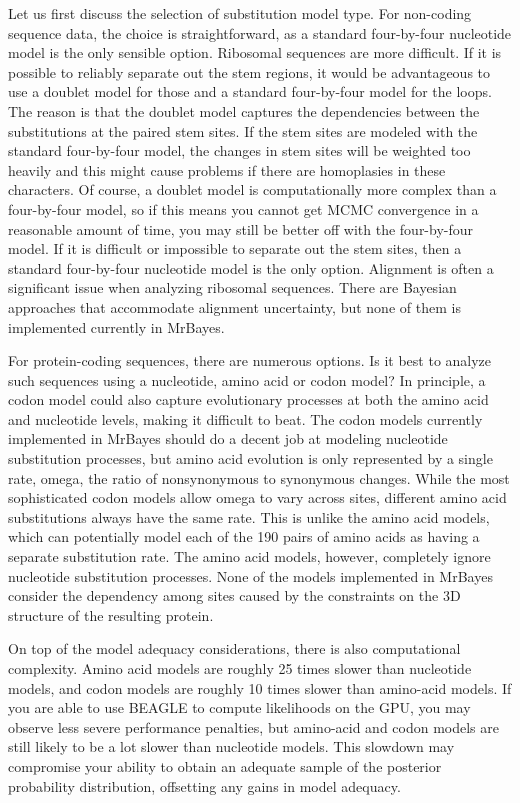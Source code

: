 \documentclass[12pt]{book}
\begin{document}
Let us first discuss the selection of substitution model type. For non-coding sequence data, the
choice is straightforward, as a standard four-by-four nucleotide model is the only sensible option.
Ribosomal sequences are more difficult. If it is possible to reliably separate out the stem
regions, it would be advantageous to use a doublet model for those and a standard four-by-four
model for the loops. The reason is that the doublet model captures the dependencies between the
substitutions at the paired stem sites. If the stem sites are modeled with the standard
four-by-four model, the changes in stem sites will be weighted too heavily and this might cause
problems if there are homoplasies in these characters. Of course, a doublet model is
computationally more complex than a four-by-four model, so if this means you cannot get MCMC
convergence in a reasonable amount of time, you may still be better off with the four-by-four
model. If it is difficult or impossible to separate out the stem sites, then a standard
four-by-four nucleotide model is the only option. Alignment is often a significant issue when
analyzing ribosomal sequences. There are Bayesian approaches that accommodate alignment
uncertainty, but none of them is implemented currently in MrBayes.

For protein-coding sequences, there are numerous options. Is it best to analyze such sequences
using a nucleotide, amino acid or codon model? In principle, a codon model could also capture
evolutionary processes at both the amino acid and nucleotide levels, making it difficult to beat.
The codon models currently implemented in MrBayes should do a decent job at modeling nucleotide
substitution processes, but amino acid evolution is only represented by a single rate, omega, the
ratio of nonsynonymous to synonymous changes. While the most sophisticated codon models allow omega
to vary across sites, different amino acid substitutions always have the same rate. This is unlike
the amino acid models, which can potentially model each of the 190 pairs of amino acids as having a
separate substitution rate. The amino acid models, however, completely ignore nucleotide
substitution processes. None of the models implemented in MrBayes consider the dependency among
sites caused by the constraints on the 3D structure of the resulting protein.

On top of the model adequacy considerations, there is also computational complexity. Amino acid
models are roughly 25 times slower than nucleotide models, and codon models are roughly 10 times
slower than amino-acid models. If you are able to use BEAGLE to compute likelihoods on the GPU, you
may observe less severe performance penalties, but amino-acid and codon models are still likely to
be a lot slower than nucleotide models. This slowdown may compromise your ability to obtain an
adequate sample of the posterior probability distribution, offsetting any gains in model adequacy.
\end{document}

